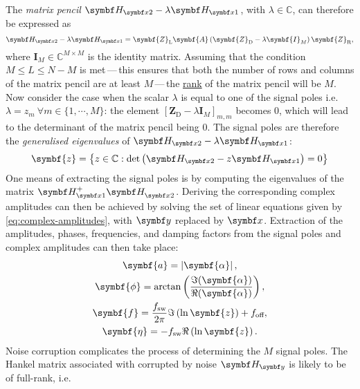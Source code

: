 The \emph{matrix pencil} $\Hxtwo - \lambda\Hxone$, with $\lambda \in
\mathbb{C}$, can therefore be expressed as
\begin{equation}
    \Hxtwo - \lambda \Hxone = \symbf{Z}_{\text{L}} \symbf{A} \left(
        \symbf{Z}_{\text{D}} - \lambda \symbf{I}_M
    \right) \symbf{Z}_{\text{R}},
\end{equation}
where $\symbf{I}_M \in \mathbb{C}^{M \times M}$ is the identity matrix.
Assuming that the condition $M \leq L \leq N - M$ is met\,---\,this ensures
that both the number of rows and columns of the matrix pencil are at least
$M$\,---\,the \underline{rank} of the matrix pencil will be $M$.
Now consider the case when the scalar $\lambda$ is
equal to one of the signal poles i.e.  $\lambda = z_m\ \forall m \in
\lbrace 1, \cdots, M \rbrace$: the element $[\symbf{Z}_{\text{D}} -
\lambda \symbf{I}_M]_{m,m}$ becomes $0$, which will lead to the
determinant of the matrix pencil being $0$. The signal poles are therefore the
\emph{generalised eigenvalues} of $\Hxtwo - \lambda \Hxone$\cite[Section
7.7]{Golub2013}:
\begin{equation}
    \symbf{z} = \left\lbrace
        z \in \mathbb{C} : \det\left(\Hxtwo - z \Hxone\right) = 0
    \right\rbrace
\end{equation}
One means of extracting the signal poles is by computing the eigenvalues of the
matrix $\Hxone^+ \Hxtwo^{\vphantom{+}}$. Deriving the corresponding complex
amplitudes can then be achieved by solving the set of linear equations given by
\cref{eq:complex-amplitudes}, with $\by$ replaced by $\bx$.
Extraction of the amplitudes, phases, frequencies, and damping factors from the
signal poles and complex amplitudes can then take place:%
\begin{subequations}%
    \begin{gather}
        \symbf{a} = \left \lvert \symbf{\alpha} \right \rvert,\\
        \symbf{\phi} = \arctan \left(\frac{\Im (\symbf{\alpha})}{\Re(\symbf{\alpha})}\right),\\
        \symbf{f} = \frac{\fsw}{2 \pi} \Im\left(\ln \symbf{z} \right) + \foff,\label{eq:poles-to-f}\\
        \symbf{\eta} = -\fsw \Re\left(\ln \symbf{z}\right).
    \end{gather}
\end{subequations}
Noise corruption complicates the process of
determining the $M$ signal poles. The Hankel matrix associated with
 corrupted by noise $\Hy$ is likely to be of full-rank, i.e.
